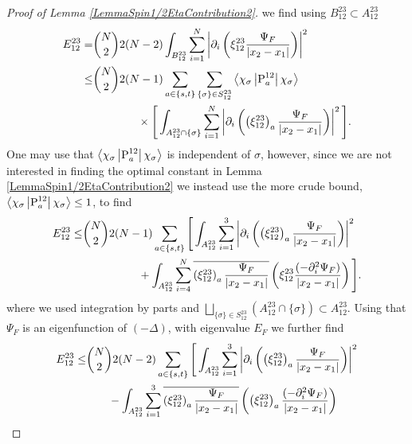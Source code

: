 \begin{proof}[Proof of Lemma \ref{LemmaSpin1/2EtaContribution2}]
 we find using $ B_{12}^{23}\subset A_{12}^{23} $
\begin{equation}
\begin{aligned}
E_{12}^{23}=&\binom{N}{2}2(N-2)\int_{B_{12}^{23}}\sum_{i=1}^{N}\left\lvert \partial_i\left(\xi_{12}^{23} \frac{\Psi_F}{\left\lvert x_2-x_1 \right\rvert}\right) \right\rvert^2\\
\leq& \binom{N}{2}2(N-1)\sum_{a\in\{s,t\}}\sum_{\{\sigma\}\in S_{12}^{23}}\left\langle\chi_{\sigma}\left\lvert \operatorname{P}_a^{12}\right \rvert \chi_{\sigma}\right\rangle\\&\qquad\qquad\times\Bigg[\int_{A_{12}^{23}\cap\{\sigma\}}\sum_{i=1}^{N}\left\lvert \partial_i\left(\left(\xi_{12}^{23}\right)_a \frac{\Psi_F}{\left\lvert x_2-x_1 \right\rvert}\right) \right\rvert^2\Bigg].
\end{aligned}
\end{equation}
One may use that $ \left\langle\chi_{\sigma}\left\lvert \operatorname{P}_a^{12}\right \rvert \chi_{\sigma}\right\rangle $ is independent of $ \sigma $, however, since we are not interested in finding the optimal constant in Lemma \ref{LemmaSpin1/2EtaContribution2} we instead use the more crude bound, $ \left\langle\chi_{\sigma}\left\lvert \operatorname{P}_a^{12}\right \rvert \chi_{\sigma}\right\rangle\leq 1 $, to find
\begin{equation}\label{key}
\begin{aligned}
E_{12}^{23}\leq& \binom{N}{2}2(N-1)\sum_{a\in\{s,t\}}\Bigg[\int_{A_{12}^{23}}\sum_{i=1}^{3}\left\lvert \partial_i\left(\left(\xi_{12}^{23}\right)_a \frac{\Psi_F}{\left\lvert x_2-x_1 \right\rvert}\right) \right\rvert^2 \\&\qquad\qquad\quad+\int_{A_{12}^{23}}\sum_{i=4}^{N}\overline{\left(\xi_{12}^{23}\right)_a \frac{\Psi_F}{\left\lvert x_2-x_1 \right\rvert}}\left(\xi_{12}^{23} \frac{(-\partial_i^2\Psi_F)}{\left\lvert x_2-x_1 \right\rvert}\right)\Bigg].
\end{aligned}
\end{equation}
where we used integration by parts and $ \bigsqcup_{\{\sigma\}\in S_{12}^{23}}\left(A_{12}^{23}\cap \{\sigma\}\right)\subset A_{12}^{23} $.  Using that $ \Psi_F $ is an eigenfunction of $ (-\Delta) $, with eigenvalue $ E_F $ we further find
\begin{equation}
\begin{aligned}
E_{12}^{23}\leq& \binom{N}{2}2(N-2)\sum_{a\in\{s,t\}}\Bigg[\int_{A_{12}^{23}}\sum_{i=1}^{3}\abs{\partial_i\left(\left(\xi_{12}^{23}\right)_a \frac{\Psi_F}{\abs{x_2-x_1}}\right)}^2 \\&\qquad-\int_{A_{12}^{23}}\sum_{i=1}^{3}\overline{\left(\xi_{12}^{23}\right)_a \frac{\Psi_F}{\abs{x_2-x_1}}}\left(\left(\xi_{12}^{23}\right)_a \frac{(-\partial_i^2\Psi_F)}{\abs{x_2-x_1}}\right)\\

\end{aligned}
\end{equation}
\end{proof}
